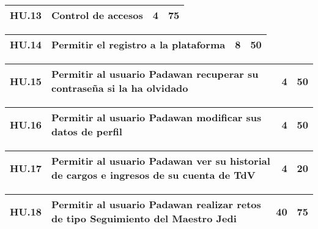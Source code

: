 \begin{table}[h]
	\centering
	\begin{tabular}{| p{2.3cm} | p{5.1cm} | p{2cm} | p{1.6cm} |}
		\hline 
		HU.13 & Control de accesos & 4 & 75 \\ \hline 
	\end{tabular}
\end{table}   

\begin{table}[h]
	\centering
	\begin{tabular}{| p{2.3cm} | p{5.1cm} | p{2cm} | p{1.6cm} |}
		\hline 
		HU.14 & Permitir el registro a la plataforma & 8 & 50 \\ \hline 
	\end{tabular}
\end{table}   

\begin{table}[h]
	\centering
	\begin{tabular}{| p{2.3cm} | p{5.1cm} | p{2cm} | p{1.6cm} |}
		\hline 
		HU.15 & Permitir al usuario Padawan recuperar su contraseña si la ha olvidado & 4 & 50 \\ \hline 
	\end{tabular}
\end{table}   

\begin{table}[h]
	\centering
	\begin{tabular}{| p{2.3cm} | p{5.1cm} | p{2cm} | p{1.6cm} |}
		\hline 
		HU.16 & Permitir al usuario Padawan modificar sus datos de perfil & 4 & 50 \\ \hline 
	\end{tabular}
\end{table}   

\begin{table}[h]
	\centering
	\begin{tabular}{| p{2.3cm} | p{5.1cm} | p{2cm} | p{1.6cm} |}
		\hline 
		HU.17 & Permitir al usuario Padawan ver su historial de cargos e ingresos de su cuenta de TdV & 4 & 20 \\ \hline 
	\end{tabular}
\end{table}   

\begin{table}[h]
	\centering
	\begin{tabular}{| p{2.3cm} | p{5.1cm} | p{2cm} | p{1.6cm} |}
		\hline 
		HU.18 & Permitir al usuario Padawan realizar retos de tipo Seguimiento del Maestro Jedi & 40 & 75 \\ \hline 
	\end{tabular}
\end{table}   

